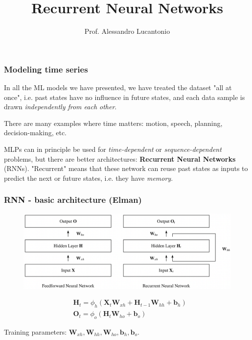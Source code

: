 \documentclass{beamer}
\title{Recurrent Neural Networks}
\author{Prof. Alessandro Lucantonio}
\institute{Aarhus University}
\date{}
\begin{document}
	\frame{\titlepage}
	
	
			
			\begin{frame}
				\frametitle{Modeling time series}
					 In all the ML models we have presented, we have treated the dataset "all at once", i.e. past states have no influence in future states, and each data sample is drawn \textit{independently from each other}.
					
					\vspace{5mm}
					
					There are many examples where time matters: motion, speech, planning, decision-making, etc. 
					
					\vspace{5mm}
					
					MLPs can in principle be used for \textit{time-dependent} or \textit{sequence-dependent} problems, but there are better architectures: \textbf{Recurrent Neural Networks} (RNNs).
					"Recurrent" means that these network can reuse past states as inputs to predict the next or future states, i.e. they have \textit{memory}. 
				
			\end{frame}
			
		\begin{frame}
				\frametitle{RNN - basic architecture (Elman)}
		
					\begin{figure}
						\centering
						\includegraphics[scale=0.35]{images/rnn_1}

					\end{figure}
			
			\begin{align*}
 					&\bm{H}_t = \phi_h (\bm{X}_t \bm{W}_{xh} + \bm{H}_{t-1}\bm{W}_{hh} + \bm{b}_h) \\
 					&\bm{O}_t = \phi_o (\bm{H}_t\bm{W}_{ho} + \bm{b}_o) 
			\end{align*}

			Training parameters: $\bm{W}_{xh},\bm{W}_{hh},\bm{W}_{ho},\bm{b}_h,\bm{b}_o$.
		\end{frame}
		
\end{document}
